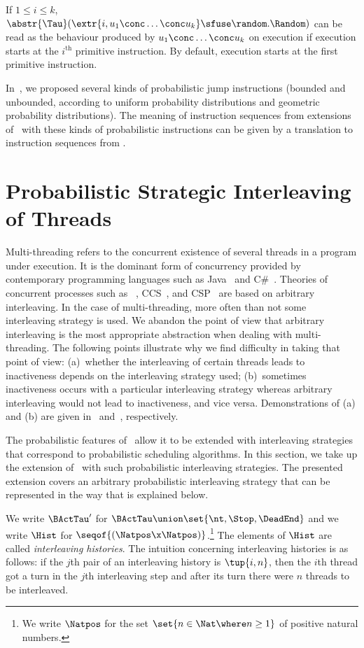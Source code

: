 \documentclass{llncs}
\begin{document}
If $1 \leq i \leq k$, 
$\abstr{\Tau}
  (\extr{i,u_1 \conc \ldots \conc u_k} \sfuse \random.\Random)$ can be 
read as the behaviour produced by $u_1 \conc \ldots \conc u_k$ on 
execution if execution starts at the $i^\mathrm{th}$ primitive 
instruction.
By default, execution starts at the first primitive instruction.

In~\cite{BM09f}, we proposed several kinds of probabilistic jump
instructions (bounded and unbounded, according to uniform probability 
distributions and geometric probability distributions).
The meaning of instruction sequences from extensions of \prPGLB\ with
these kinds of probabilistic instructions can be given by a translation 
to instruction sequences from \prPGLB.

\section{Probabilistic Strategic Interleaving of Threads}
\label{sect-strategic-interleaving}

Multi-threading refers to the concurrent existence of several threads
in a program under execution.
It is the dominant form of concurrency provided by contemporary 
programming languages such as Java~\cite{GJSB00a} and C\#~\cite{HWG03a}.
Theories of concurrent processes such as \ACP~\cite{BW90}, 
CCS~\cite{Mil89}, and CSP~\cite{Hoa85} are based on arbitrary 
interleaving.
In the case of multi-threading, more often than not some interleaving 
strategy is used.
We abandon the point of view that arbitrary interleaving is the most 
appropriate abstraction when dealing with multi-threading.
The following points illustrate why we find difficulty in taking that
point of view:
(a)~whether the interleaving of certain threads leads to inactiveness
depends on the interleaving strategy used;
(b)~sometimes inactiveness occurs with a particular interleaving
strategy whereas arbitrary interleaving would not lead to inactiveness, 
and vice versa.
Demonstrations of (a) and (b) are given in~\cite{BM04c}
and~\cite{BM05c}, respectively.

The probabilistic features of \prBTA\ allow it to be extended with 
interleaving strategies that correspond to probabilistic scheduling 
algorithms.
In this section, we take up the extension of \prBTA\ with such
probabilistic interleaving strategies.
The presented extension covers an arbitrary probabilistic interleaving 
strategy that can be represented in the way that is explained below.

We write $\BActTau'$ for $\BActTau \union \set{\nt,\Stop,\DeadEnd}$ and 
we write $\Hist$ for $\seqof{(\Natpos \x \Natpos)}$.\footnote
{We write $\Natpos$ for the set $\set{n \in \Nat \where n \geq 1}$ of 
positive natural numbers.}
The elements of $\Hist$ are called \emph{interleaving histories}.
The intuition concerning interleaving histories is as follows:
if the $j$th pair of an interleaving history is $\tup{i,n}$, then the 
$i$th thread got a turn in the $j$th interleaving step and after its
turn there were $n$ threads to be interleaved.
\end{document}
